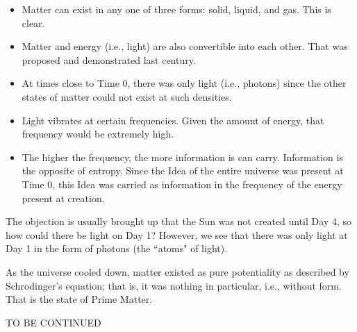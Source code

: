 \begin{itemize}
\item Matter can exist in any one of three forms: solid, liquid, and gas. This is clear. 
\item Matter and energy (i.e., light) are also convertible into each other. That was proposed and demonstrated last century. 
\item At times close to Time 0, there was only light (i.e., photons) since the other states of matter could not exist at such densities. 
\item Light vibrates at certain frequencies. Given the amount of energy, that frequency would be extremely high. 
\item The higher the frequency, the more information is can carry. Information is the opposite of entropy. Since the Idea of the entire universe was present at Time 0, this Idea was carried as information in the frequency of the energy present at creation. 
\end{itemize}
The objection is usually brought up that the Sun was not created until Day 4, so how could there be light on Day 1? However, we see that there was only light at Day 1 in the form of photons (the ``atoms" of light).

As the universe cooled down, matter existed as pure potentiality as described by Schrodinger's equation; that is, it was nothing in particular, i.e., without form. That is the state of Prime Matter.

TO BE CONTINUED

